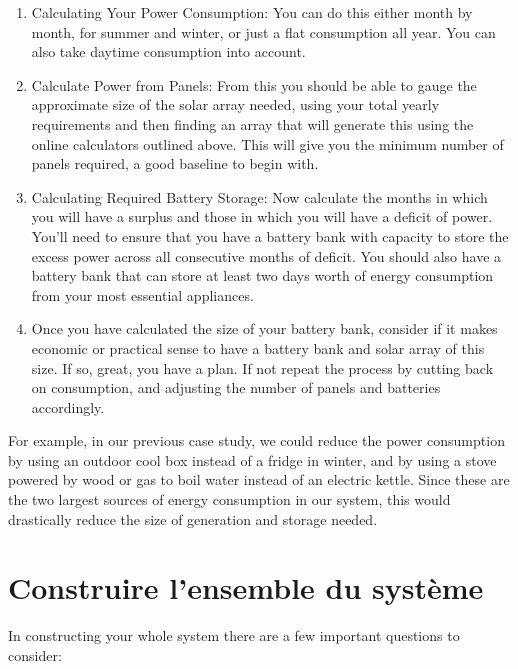 \documentclass{article}
\theoremstyle{definition}
\theoremstyle{definition}
\theoremstyle{remark}
\begin{document}
    \begin{enumerate}
      \item Calculating Your Power Consumption: You can do this either month by month, for summer and winter, or just a flat consumption all year. You can also take daytime consumption into account.
      \item Calculate Power from Panels: From this you should be able to gauge the approximate size of the solar array needed, using your total yearly requirements and then finding an array that will generate this using the online calculators outlined above. This will give you the minimum number of panels required, a good baseline to begin with. 
      \item Calculating Required Battery Storage: Now calculate the months in which you will have a surplus and those in which you will have a deficit of power. You'll need to ensure that you have a battery bank with capacity to store the excess power across all consecutive months of deficit. You should also have a battery bank that can store at least two days worth of energy consumption from your most essential appliances.
      \item Once you have calculated the size of your battery bank, consider if it makes economic or practical sense to have a battery bank and solar array of this size. If so, great, you have a plan. If not repeat the process by cutting back on consumption, and adjusting the number of panels and batteries accordingly.
    \end{enumerate}

    For example, in our previous case study, we could reduce the power consumption by using an outdoor cool box instead of a fridge in winter, and by using a stove powered by wood or gas to boil water instead of an electric kettle. Since these are the two largest sources of energy consumption in our system, this would drastically reduce the size of generation and storage needed.
  


{\color{blue}\section{Construire l'ensemble du système}} %
\label{sec:construire_l_ensemble_du_systeme}

  In constructing your whole system there are a few important questions to consider:
\end{document}

